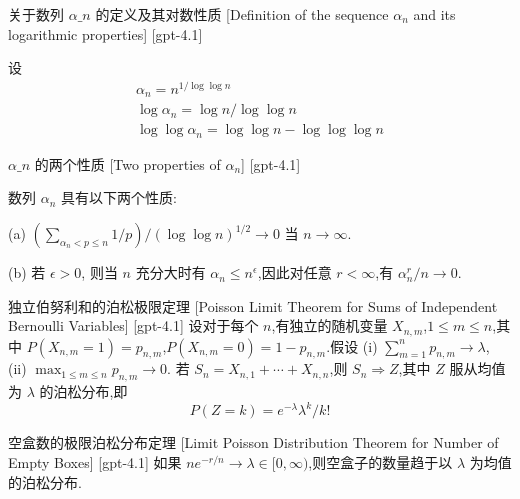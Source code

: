 \documentclass[UTF8]{ctexart}
\begin{document}
    
    
    \begin{dfn}
        {关于数列 $\alpha\_n$ 的定义及其对数性质}
        [Definition of the sequence $\alpha_n$ and its logarithmic properties]
        [gpt-4.1]
        
设
\[
\begin{array}{c}
\alpha_n = n^{1/\log\log n} \\
\log \alpha_n = \log n / \log\log n \\
\log\log \alpha_n = \log\log n - \log\log\log n
\end{array}
\]

    \end{dfn}
    
    
    
    \begin{ppt}
        {$\alpha\_n$ 的两个性质}
        [Two properties of $\alpha_n$]
        [gpt-4.1]
        
数列 $\alpha_n$ 具有以下两个性质:

(a) $\left(\sum_{\alpha_n < p \leq n} 1/p\right) / (\log \log n)^{1/2} \to 0$ 当 $n\to\infty$.

(b) 若 $\epsilon > 0$, 则当 $n$ 充分大时有 $\alpha_n \leq n^{\epsilon}$,因此对任意 $r < \infty$,有 $\alpha_n^r / n \to 0$.

    \end{ppt}
    
    
    
    \begin{thm}
        {独立伯努利和的泊松极限定理}
        [Poisson Limit Theorem for Sums of Independent Bernoulli Variables]
        [gpt-4.1]
        设对于每个 $n$,有独立的随机变量 $X_{n,m}$,$1 \leq m \leq n$,其中 $P(X_{n,m} = 1) = p_{n,m}$,$P(X_{n,m} = 0) = 1 - p_{n,m}$.假设
(i) $\sum_{m=1}^n p_{n,m} \to \lambda$,
(ii) $\max_{1 \leq m \leq n} p_{n,m} \to 0$.
若 $S_n = X_{n,1} + \cdots + X_{n,n}$,则 $S_n \Rightarrow Z$,其中 $Z$ 服从均值为 $\lambda$ 的泊松分布,即
\[
P(Z = k) = e^{-\lambda} \lambda^k / k!
\]

    \end{thm}
    
    
    
    \begin{thm}
        {空盒数的极限泊松分布定理}
        [Limit Poisson Distribution Theorem for Number of Empty Boxes]
        [gpt-4.1]
        如果 $n e^{ - r / n } \to \lambda \in [ 0 , \infty )$,则空盒子的数量趋于以 $\lambda$ 为均值的泊松分布.
    \end{thm}
    
\end{document}
